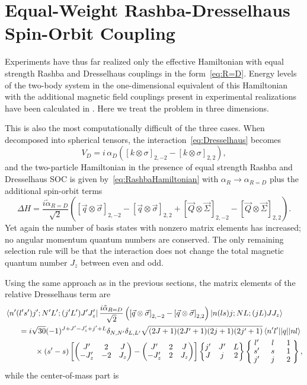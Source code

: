 \section{\label{sec:R=D}Equal-Weight Rashba-Dresselhaus Spin-Orbit Coupling}

Experiments have thus far realized only the effective Hamiltonian with equal strength Rashba and Dresselhaus couplings in the form~\eqref{eq:R=D}. Energy levels of the two-body system in the one-dimensional equivalent of this Hamiltonian with the additional magnetic field couplings present in experimental realizations have been calculated in \cite{guan2014energy}. Here we treat the problem in three dimensions.

This is also the most computationally difficult of the three cases. When decomposed into spherical tensors, the interaction~\eqref{eq:Dresselhaus} becomes
\begin{equation}
V_D=i\,\alpha_D \left( \left[ k \otimes \sigma \right]_{2,-2}- \left[ k \otimes \sigma \right]_{2,2}\right),
\end{equation}
and the two-particle Hamiltonian in the presence of equal strength Rashba and Dresselhaus SOC is given by~\eqref{eq:RashbaHamiltonian} with $\alpha_R\rightarrow \alpha_{R=D}$ plus the additional spin-orbit terms
\begin{equation}\label{eq:DresselhausHamiltonian}
\Delta H= \frac{i \tilde{\alpha}_{R=D}}{\sqrt{2}}\left(  \left[ \vec{q} \otimes \vec{\sigma} \right]_{2,-2} -  \left[ \vec{q} \otimes \vec{\sigma} \right]_{2,2} +[ \vec{Q} \otimes \vec{\Sigma} ]_{2,-2} -  [ \vec{Q} \otimes \vec{\Sigma} ]_{2,2} \right).
\end{equation} 
Yet again the number of basis states with nonzero matrix elements has increased; no angular momentum quantum numbers are conserved. The only remaining selection rule will be that the interaction does not change the total magnetic quantum number $J_z$ between even and odd. 

Using the same approach as in the previous sections, the matrix elements of the relative Dresselhaus term are
\begin{equation}\begin{split}
&\bra{n'(l's')j';N'L';(j'L')J'J'_z} \frac{i \tilde{\alpha}_{R=D}}{\sqrt{2}}\left(  \left[ \vec{q} \otimes \vec{\sigma} \right]_{2,-2} -  \left[ \vec{q} \otimes \vec{\sigma} \right]_{2,2} \right)  \ket{n(ls)j;NL;(jL)JJ_z}  \\
 &\quad\hphantom{\times}= i \sqrt{30}(-1)^{J+J'-J'_z+j'+L}\delta_{N,N'}\delta_{L,L'} \sqrt{(2J+1)(2J'+1)(2j+1)(2j'+1)}  \braket{n'l' || q || n l}\\
 &\hspace{1cm}\quad \times(s'-s) \left[\threej{J'}{2}{J}{-J'_z}{-2}{J_z}-\threej{J'}{2}{J}{-J'_z}{2}{J_z}\right] \sixj{j'}{J'}{L}{J}{j}{2}
 \renewcommand{\arraystretch}{0.9} \ninej{\hphantom{l}l'\hphantom{l}}{\hphantom{l}l\hphantom{l}}{\hphantom{l}1\hphantom{l}}{s'}{s}{1}{j'}{j}{2},
\end{split}
\end{equation}
while the center-of-mass part is 

